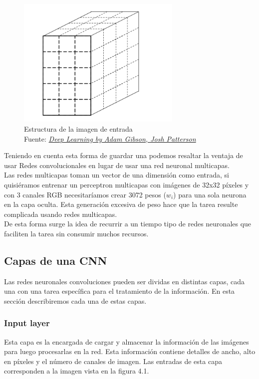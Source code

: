 \begin{figure}[H]
	\centering
	\includegraphics[width=0.7\textwidth]{Figures/image.png}
	\caption{Estructura de la imagen de entrada \\ Fuente:  \href{https://www.safaribooksonline.com/library/view/deep-learning/9781491924570/ch04.html}{\textit{Deep Learning by Adam Gibson, Josh Patterson}}}
	\label{image}
\end{figure} 

Teniendo en cuenta esta forma de guardar una podemos resaltar la ventaja de usar Redes convolucionales en lugar de usar una red neuronal multicapas.\\ Las redes multicapas toman un vector de una dimensión como entrada, si quisiéramos entrenar un perceptron multicapas con imágenes de 32x32 píxeles y con 3 canales RGB necesitaríamos crear 3072 pesos ($w_{i}$) para una sola neurona en la capa oculta. Esta generación excesiva de peso hace que la tarea resulte complicada usando redes multicapas.\\ De esta forma surge la idea de recurrir a un tiempo tipo de redes neuronales que faciliten la tarea sin consumir muchos recursos.
\subsection{Capas de una CNN}
Las redes neuronales convoluciones pueden ser dividas en distintas capas, cada una con una tarea específica para el tratamiento de la información. En esta sección describiremos cada una de estas capas.
\subsubsection{Input layer}
Esta capa es la encargada de cargar y almacenar la información de las imágenes para luego procesarlas en la red. Esta información contiene detalles de ancho, alto en píxeles y el número de canales de imagen. Las entradas de esta capa corresponden a la imagen vista en la figura 4.1.

